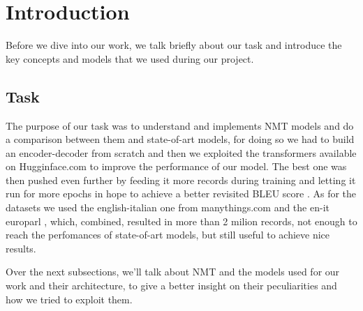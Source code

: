 \section{Introduction}
Before we dive into our work, we talk briefly about our task and introduce the key concepts and models that we used during our project.
\subsection{Task}
The purpose of our task was to understand and implements NMT models and do a comparison between them and state-of-art models, for doing so we had to build an encoder-decoder from scratch and then we exploited the transformers available on Hugginface.com \cite{huggingface_co} to improve the performance of our model. The best one was then pushed even further by feeding it more records during training and letting it run for more epochs in hope to achieve a better revisited BLEU score \cite{goyal2021flores}. As for the datasets we used the english-italian one from manythings.com\cite{anki_dataset} and the en-it europarl \cite{koehn2005europarl}, which, combined, resulted in more than 2 milion records, not enough to reach the perfomances of state-of-art models, but still useful to achieve nice results.
\vspace{3mm}

Over the next subsections, we'll talk about NMT and the models used for our work and their architecture, to give a better insight on their peculiarities and how we tried to exploit them.

